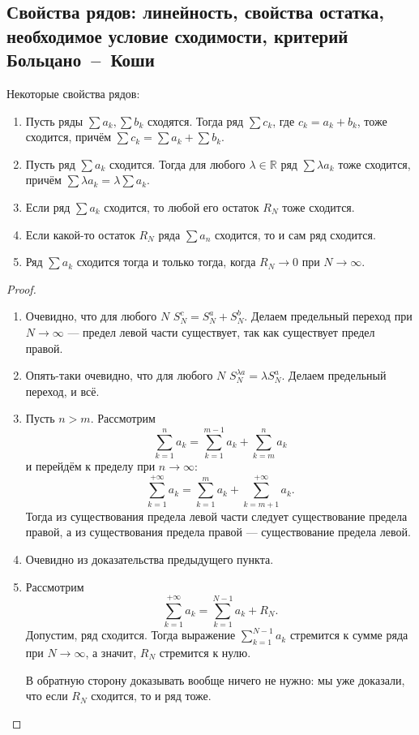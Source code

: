 \subsection{Свойства рядов: линейность, свойства остатка, необходимое условие сходимости, критерий Больцано~--~Коши}

\begin{theorem} \hypertarget{свойства рядов}{}
	Некоторые свойства рядов:
	\begin{enumerate}
		\item Пусть ряды  \(\sum a_k, \sum b_k\) сходятся. Тогда ряд \(\sum c_k\), где \(c_k = a_k + b_k\), тоже сходится, причём \(\sum c_k = \sum a_k + \sum b_k\).
		\item Пусть ряд \(\sum a_k\) сходится. Тогда для любого \(\lambda \in \mathbb{R}\) ряд \(\sum \lambda a_k\) тоже сходится, причём \(\sum \lambda a_k = \lambda \sum a_k\).
		\item Если ряд \(\sum a_k\) сходится, то любой его остаток \(R_N\) тоже сходится.
		\item Если какой-то остаток \(R_N\) ряда \(\sum a_n\) сходится, то и сам ряд сходится.
		\item Ряд \(\sum a_k\) сходится тогда и только тогда, когда \(R_N \to 0\) при \(N \to \infty\).
	\end{enumerate}
\end{theorem}
\begin{proof}
	\begin{enumerate}
		\item Очевидно, что для любого \(N\) \(S_N^c = S_N^a + S_N^b\). Делаем предельный переход при \(N \to \infty\) --- предел левой части существует, так как существует предел правой.
		\item Опять-таки очевидно, что для любого \(N\) \(S_N^{\lambda a} = \lambda S_N^a\). Делаем предельный переход, и всё.
		\item Пусть \(n > m\). Рассмотрим \[
		\sum_{k=1}^{n} a_k = \sum_{k=1}^{m-1} a_k + \sum_{k=m}^{n} a_k
		\]
		и перейдём к пределу при \(n \to \infty\): \[
		\sum_{k=1}^{+\infty} a_k = \sum_{k=1}^{m} a_k + \sum_{k=m+1}^{+\infty} a_k.
		\]
		Тогда из существования предела левой части следует существование предела правой, а из существования предела правой --- существование предела левой.
		\item Очевидно из доказательства предыдущего пункта.
		\item Рассмотрим \[
		\sum_{k=1}^{+\infty} a_k = \sum_{k=1}^{N-1} a_k + R_N.
		\]
		Допустим, ряд сходится. Тогда выражение \(\sum\limits_{k=1}^{N-1} a_k\) стремится к сумме ряда при \(N \to \infty\), а значит, \(R_N\) стремится к нулю.
		
		В обратную сторону доказывать вообще ничего не нужно: мы уже доказали, что если \(R_N\) сходится, то и ряд тоже.
	\end{enumerate}
\end{proof}

